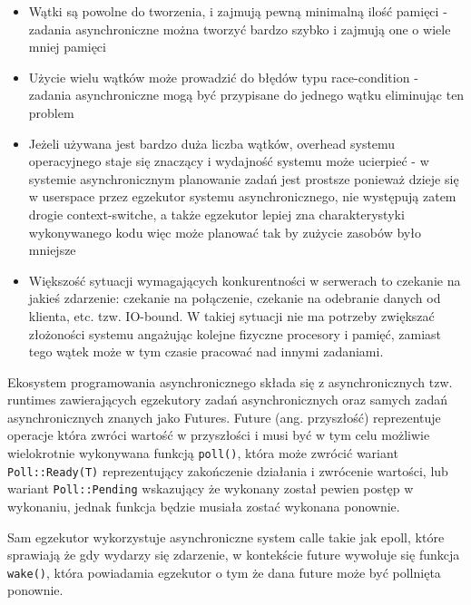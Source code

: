 \begin{itemize}
    \item Wątki są powolne do tworzenia, i zajmują pewną minimalną ilość pamięci - zadania
          asynchroniczne można tworzyć bardzo szybko i zajmują one o wiele mniej pamięci
    \item Użycie wielu wątków może prowadzić do błędów typu race-condition - zadania
          asynchroniczne mogą być przypisane do jednego wątku eliminując ten problem
    \item Jeżeli używana jest bardzo duża liczba wątków, overhead systemu operacyjnego staje się
          znaczący i wydajność systemu może ucierpieć - w systemie asynchronicznym planowanie
          zadań jest prostsze ponieważ dzieje się w userspace przez egzekutor systemu
          asynchronicznego, nie występują zatem drogie context-switche, a także egzekutor lepiej
          zna charakterystyki wykonywanego kodu więc może planować tak by zużycie zasobów było
          mniejsze
    \item Większość sytuacji wymagających konkurentności w serwerach to czekanie na jakieś
          zdarzenie: czekanie na połączenie, czekanie na odebranie danych od klienta, etc. tzw.
          IO-bound. W takiej sytuacji nie ma potrzeby zwiększać złożoności systemu angażując
          kolejne fizyczne procesory i pamięć, zamiast tego wątek może w tym czasie pracować nad
          innymi zadaniami.
\end{itemize}

Ekosystem programowania asynchronicznego składa się z asynchronicznych tzw. runtimes zawierających
egzekutory zadań asynchronicznych oraz samych zadań asynchronicznych znanych jako Futures. Future
(ang. przyszłość) reprezentuje operacje która zwróci wartość w przyszłości i musi być w tym celu
możliwie wielokrotnie wykonywana funkcją \verb|poll()|, która może zwrócić wariant
\verb|Poll::Ready(T)| reprezentujący zakończenie działania i zwrócenie wartości, lub wariant
\verb|Poll::Pending| wskazujący że wykonany został pewien postęp w wykonaniu, jednak funkcja będzie
musiała zostać wykonana ponownie.

Sam egzekutor wykorzystuje asynchroniczne system calle takie jak epoll, które sprawiają że gdy
wydarzy się zdarzenie, w kontekście future wywołuje się funkcja \verb|wake()|, która powiadamia
egzekutor o tym że dana future może być pollnięta ponownie.

